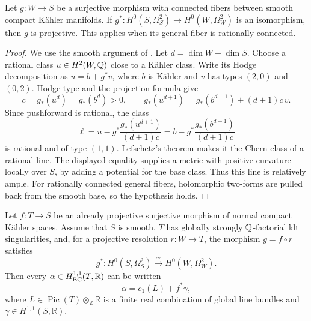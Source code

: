 \begin{lemma}
\label{prog:smooth-polarization}
Let \(g:W\to S\) be a surjective morphism with connected fibers
between smooth compact Kähler manifolds. If
\(g^*:H^0(S,\Omega_S^2)\to H^0(W,\Omega_W^2)\) is an isomorphism,
then \(g\) is projective. This applies when its general fiber is
rationally connected.
\end{lemma}

\begin{proof}
We use the smooth argument of \cite[Theorem~3.1, Step~1]{CH}.
Let \(d=\dim W-\dim S\). Choose a rational class \(u\in H^2(W,\mathbb Q)\)
close to a Kähler class. Write its Hodge decomposition as
\(u=b+g^*v\), where \(b\) is Kähler and \(v\) has types \((2,0)\)
and \((0,2)\). Hodge type and the projection formula give
\[
 c=g_*(u^d)=g_*(b^d)>0,\qquad
 g_*(u^{d+1})=g_*(b^{d+1})+(d+1)c\,v.
\]
Since pushforward is rational, the class
\[
 \ell=u-g^*\frac{g_*(u^{d+1})}{(d+1)c}
      =b-g^*\frac{g_*(b^{d+1})}{(d+1)c}
\]
is rational and of type \((1,1)\). Lefschetz's theorem makes it the
Chern class of a rational line. The displayed equality supplies a
metric with positive curvature locally over \(S\), by adding a
potential for the base class. Thus this line is relatively ample.
For rationally connected general fibers, holomorphic two-forms are
pulled back from the smooth base, so the hypothesis holds.
\end{proof}

\begin{lemma}
\label{prog:relative-hodge}
Let $f:T\to S$ be an already projective surjective morphism of normal
compact K\"ahler spaces. Assume that $S$ is smooth, $T$ has globally
strongly $\mathbb Q$-factorial klt singularities, and, for a projective resolution
$r:W\to T$, the morphism $g=f\circ r$ satisfies
\[
 g^*:H^0(S,\Omega_S^2)\xrightarrow{\ \simeq\ }
                         H^0(W,\Omega_W^2).
\]
Then every $\alpha\in H^{1,1}_{\mathrm{BC}}(T,\mathbb R)$ can be written
\[
                         \alpha=c_1(L)+f^*\gamma,
\]
where $L\in\operatorname{Pic}(T)\otimes_{\mathbb Z}\mathbb R$ is a
finite real combination of global line bundles and
$\gamma\in H^{1,1}(S,\mathbb R)$.
\end{lemma}

